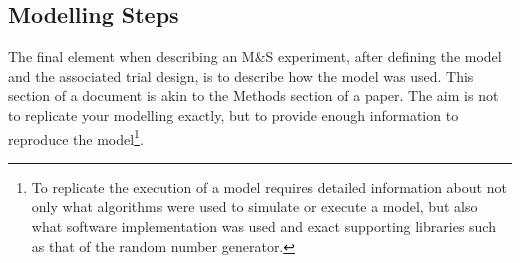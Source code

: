 


\subsection{Modelling Steps}
\label{sec:stepdeps}
The final element when describing an M\&S experiment, after defining
the model and the associated trial design, is to describe how the
model was used. This section of a \pharmml document is akin to the
Methods section of a paper. The aim is not to replicate your modelling
exactly, but to provide enough information to reproduce the
model\footnote{To replicate the execution of a model requires detailed
  information about not only what algorithms were used to simulate or
  execute a model, but also what software implementation was used and
  exact supporting libraries such as that of the random number
  generator.}.

